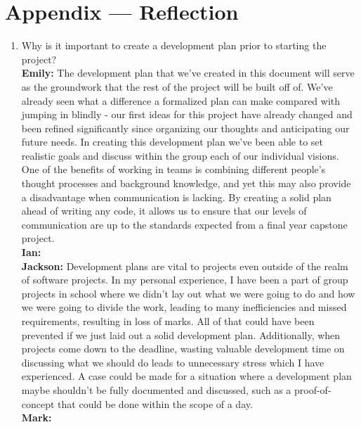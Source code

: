 \documentclass{article}
\begin{document}
\newpage{}

\section*{Appendix --- Reflection}



\begin{enumerate}
    \item Why is it important to create a development plan prior to starting the
    project?\\
    \textbf{Emily:} The development plan that we’ve created in this document will serve as the groundwork that the rest of the project will be built off of. 
                    We’ve already seen what a difference a formalized plan can make compared with jumping in blindly - our first ideas for this project have 
                    already changed and been refined significantly since organizing our thoughts and anticipating our future needs. In creating this development 
                    plan we’ve been able to set realistic goals and discuss within the group each of our individual visions. One of the benefits of working in 
                    teams is combining different people’s thought processes and background knowledge, and yet this may also provide a disadvantage when communication 
                    is lacking. By creating a solid plan ahead of writing any code, it allows us to ensure that our levels of communication are up to the standards 
                    expected from a final year capstone project. \\
    \textbf{Ian:} \\
    \textbf{Jackson:} Development plans are vital to projects even outside of the realm of software projects. In my personal experience, I have been a part of group projects 
                      in school where we didn’t lay out what we were going to do and how we were going to divide the work, leading to many inefficiencies and missed requirements, resulting 
                      in loss of marks. All of that could have been prevented if we just laid out a solid development plan. Additionally, when projects come down to the deadline, wasting 
                      valuable development time on discussing what we should do leads to unnecessary stress which I have experienced. A case could be made for a situation where a development 
                      plan maybe shouldn’t be fully documented and discussed, such as a proof-of-concept that could be done within the scope of a day.\\
    \textbf{Mark:} \\


\end{enumerate}
\end{document}
